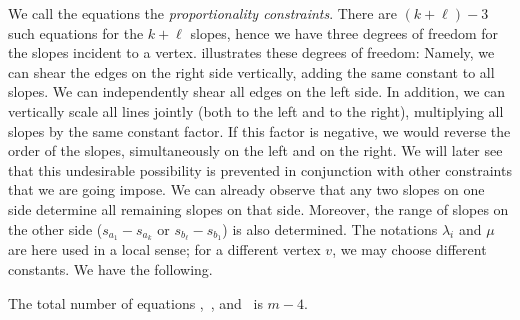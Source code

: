 We call the equations
\thetag{\ref{eq:proportion}--\ref{eq:proportion2}} the
\emph{proportionality constraints}.
There are $(k+\ell)-3$ such equations for the $k+\ell$ slopes, hence
we have three degrees of freedom for the slopes incident to a vertex.
 illustrates these  degrees of freedom:
Namely, we can shear the edges on the right side vertically, adding the same constant to all
slopes. We can independently shear all edges on the left side.
In addition, we can vertically scale {all} lines jointly (both to
the left and to the right), multiplying all slopes by the same constant factor.
If this factor is negative, we would reverse the order of the
slopes, simultaneously on the left and on the right. We will later see
that this undesirable possibility is prevented in conjunction with
other constraints that we are going impose. We can already observe
that any two slopes on one side determine all remaining slopes on that side. Moreover, the range of slopes on the other side ($s_{a_1}-s_{a_{k}}$ or $s_{b_{\ell}}-s_{b_1}$) is also determined.
%
The notations $\lambda_i$ and $\mu$ are here used in a local sense;
for a different vertex $v$, we may choose different constants.
We have the following.
\begin{lem} \label{le:number-of-equations}
The total number of equations \thetag{\ref{eq:slope0}},~\thetag{\ref{eq:proportion}}, and~\thetag{\ref{eq:proportion2}} is $m-4$.
\end{lem} 
